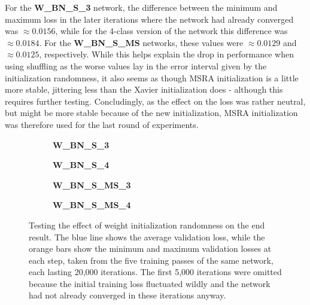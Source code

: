For the \textbf {W\_BN\_S\_3} network, the difference between the minimum and maximum loss in the later iterations where the network had already converged was $\approx0.0156$, while for the 4-class version of the network this difference was $\approx0.0184$. For the \textbf{W\_BN\_S\_MS} networks, these values were $\approx0.0129$ and $\approx0.0125$, respectively. While this helps explain the drop in performance when using shuffling as the worse values lay in the error interval given by the initialization randomness, it also seems as though MSRA initialization is a little more stable, jittering less than the Xavier initialization does - although this requires further testing. Concludingly, as the effect on the loss was rather neutral, but might be more stable because of the new initialization, MSRA initialization was therefore used for the last round of experiments.\\

\begin {figure}[!htb]
	\begin {subfigure}[b]{0.4\linewidth}
		\scalebox{0.65}{}
		\caption{\textbf{W\_BN\_S\_3}}
	\end {subfigure}\hspace{1.75cm}
	\begin {subfigure}[b]{0.4\linewidth}
		\scalebox{0.65}{}
		\caption{\textbf{W\_BN\_S\_4}}
	\end {subfigure}

	\begin {subfigure}[b]{0.4\linewidth}
		\scalebox{0.65}{}
		\caption{\textbf{W\_BN\_S\_MS\_3}}
	\end {subfigure}\hspace{1.75cm}
	\begin {subfigure}[b]{0.4\linewidth}
		\scalebox{0.65}{}
		\caption{\textbf{W\_BN\_S\_MS\_4}}
	\end {subfigure}

		\caption[Weight jitter testing.]{Testing the effect of weight initialization randomness on the end result. The blue line shows the average validation loss, while the orange bars show the minimum and maximum validation losses at each step, taken from the five training passes of the same network, each lasting 20,000 iterations. The first 5,000 iterations were omitted because the initial training loss fluctuated wildly and the network had not already converged in these iterations anyway.}
		\label{fig:weight_jitter}
\end {figure}

